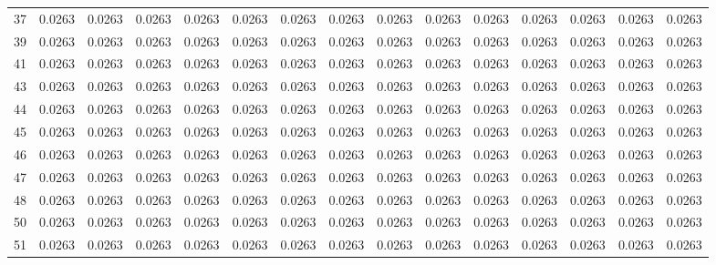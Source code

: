 \begin{table}[H]
\begin{tabular}{rrrrrrrrrrrrrrr}
37 & 0.0263 & 0.0263 & 0.0263 & 0.0263 & 0.0263 & 0.0263 & 0.0263 & 0.0263 & 0.0263 & 0.0263 & 0.0263 & 0.0263 & 0.0263 & 0.0263 \\
39 & 0.0263 & 0.0263 & 0.0263 & 0.0263 & 0.0263 & 0.0263 & 0.0263 & 0.0263 & 0.0263 & 0.0263 & 0.0263 & 0.0263 & 0.0263 & 0.0263 \\
41 & 0.0263 & 0.0263 & 0.0263 & 0.0263 & 0.0263 & 0.0263 & 0.0263 & 0.0263 & 0.0263 & 0.0263 & 0.0263 & 0.0263 & 0.0263 & 0.0263 \\
43 & 0.0263 & 0.0263 & 0.0263 & 0.0263 & 0.0263 & 0.0263 & 0.0263 & 0.0263 & 0.0263 & 0.0263 & 0.0263 & 0.0263 & 0.0263 & 0.0263 \\
44 & 0.0263 & 0.0263 & 0.0263 & 0.0263 & 0.0263 & 0.0263 & 0.0263 & 0.0263 & 0.0263 & 0.0263 & 0.0263 & 0.0263 & 0.0263 & 0.0263 \\
45 & 0.0263 & 0.0263 & 0.0263 & 0.0263 & 0.0263 & 0.0263 & 0.0263 & 0.0263 & 0.0263 & 0.0263 & 0.0263 & 0.0263 & 0.0263 & 0.0263 \\
46 & 0.0263 & 0.0263 & 0.0263 & 0.0263 & 0.0263 & 0.0263 & 0.0263 & 0.0263 & 0.0263 & 0.0263 & 0.0263 & 0.0263 & 0.0263 & 0.0263 \\
47 & 0.0263 & 0.0263 & 0.0263 & 0.0263 & 0.0263 & 0.0263 & 0.0263 & 0.0263 & 0.0263 & 0.0263 & 0.0263 & 0.0263 & 0.0263 & 0.0263 \\
48 & 0.0263 & 0.0263 & 0.0263 & 0.0263 & 0.0263 & 0.0263 & 0.0263 & 0.0263 & 0.0263 & 0.0263 & 0.0263 & 0.0263 & 0.0263 & 0.0263 \\
50 & 0.0263 & 0.0263 & 0.0263 & 0.0263 & 0.0263 & 0.0263 & 0.0263 & 0.0263 & 0.0263 & 0.0263 & 0.0263 & 0.0263 & 0.0263 & 0.0263 \\
51 & 0.0263 & 0.0263 & 0.0263 & 0.0263 & 0.0263 & 0.0263 & 0.0263 & 0.0263 & 0.0263 & 0.0263 & 0.0263 & 0.0263 & 0.0263 & 0.0263 \\
\bottomrule
\end{tabular}
\end{table}

